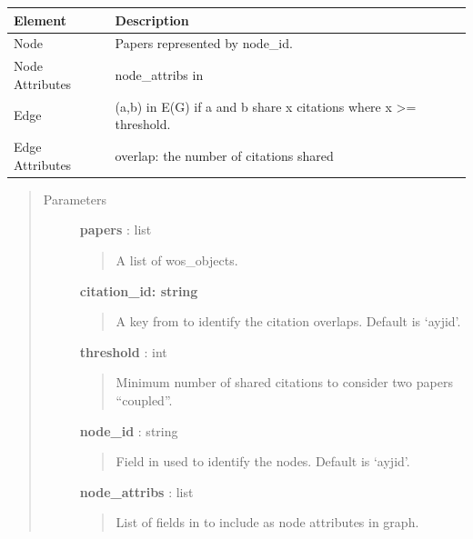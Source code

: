\documentclass[letterpaper,10pt,english]{sphinxmanual}
\begin{document}
\begin{fulllineitems}
\begin{tabulary}{\linewidth}{|L|L|}
\hline
\textsf{\relax 
Element
} & \textsf{\relax 
Description
}\\
\hline
Node
 & 
Papers represented by node\_id.
\\

Node Attributes
 & 
node\_attribs in {\hyperref[tethne.classes.paper:tethne.classes.paper.Paper]{}}
\\

Edge
 & 
(a,b) in E(G) if a and b share x citations where x \textgreater{}=
threshold.
\\

Edge Attributes
 & 
overlap: the number of citations shared
\\
\hline\end{tabulary}

\begin{quote}\begin{description}
\item[{Parameters}] \leavevmode
\textbf{papers} : list
\begin{quote}

A list of wos\_objects.
\end{quote}

\textbf{citation\_id: string}
\begin{quote}

A key from {\hyperref[tethne.classes.paper:tethne.classes.paper.Paper]{}} to identify the citation overlaps.  Default
is `ayjid'.
\end{quote}

\textbf{threshold} : int
\begin{quote}

Minimum number of shared citations to consider two papers ``coupled''.
\end{quote}

\textbf{node\_id} : string
\begin{quote}

Field in {\hyperref[tethne.classes.paper:tethne.classes.paper.Paper]{}} used to identify the nodes. Default is `ayjid'.
\end{quote}

\textbf{node\_attribs} : list
\begin{quote}

List of fields in {\hyperref[tethne.classes.paper:tethne.classes.paper.Paper]{}} to include as node attributes in
graph.
\end{quote}


\end{description}
\end{quote}
\end{fulllineitems}
\end{document}

